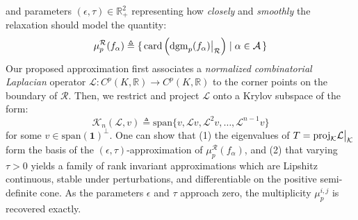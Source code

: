 \documentclass[10pt twocolumn]{article}
\numberwithin{equation}{section}
\newcommand{\+}{%
	\raisebox{0.18ex}{\scaleobj{0.55}{+}}
}
\newcommand\restr[2]{{%
  \left.\kern-\nulldelimiterspace %
  #1 %
  \vphantom{\big|} %
  \right|_{#2} %
  }}
\theoremstyle{definition}
\theoremstyle{definition}
\begin{document}
\begin{multicols}{2}
and parameters $(\epsilon, \tau ) \in \mathbb{R}_+^2$ representing how \emph{closely} and \emph{smoothly} the relaxation should model the quantity: 
	\begin{equation*}\label{eq:mu_alpha}
		\mu_p^{\mathcal{R}}(f_\alpha) \triangleq \{ \, 
	\mathrm{card}\left(\restr{\mathrm{dgm}_p(f_\alpha)}{\mathcal{R}} \right) \mid \alpha \in \mathcal{A} \, \}
	\end{equation*}
Our proposed approximation first associates a \emph{normalized combinatorial Laplacian} operator $\mathcal{L} : C^p(K, \mathbb{R}) \to C^p(K, \mathbb{R})$ to the corner points on the boundary of $\mathcal{R}$. Then, we restrict and project $\mathcal{L}$ onto a Krylov subspace of the form: 
	\begin{equation*}
	\mathcal{K}_n(\mathcal{L}, v) \triangleq \mathrm{span}\{ v, \mathcal{L}v, \mathcal{L}^2 v, \dots, \mathcal{L}^{n-1}v \}
	\end{equation*}
	for some $v \in \mathrm{span}(\textbf{1})^\perp$. One can show that (1) the eigenvalues of $T = \mathrm{proj}_{\mathcal{K}} \restr{\mathcal{L}}{\mathcal{K}}$ form the basis of the $(\epsilon, \tau)$-approximation of $\mu_p^{\mathcal{R}}(f_\alpha)$, 
	and (2) that varying $\tau > 0$ yields a family of rank invariant approximations which are Lipshitz continuous, stable under perturbations, and differentiable on the positive semi-definite cone. As the parameters $\epsilon$ and $\tau$ approach zero, the multiplicity $\mu_p^{i,j}$ is recovered exactly. 


\end{multicols}
\end{document}
